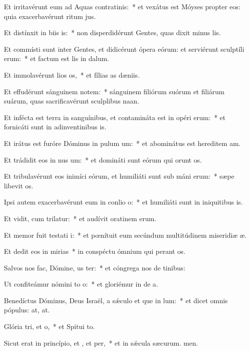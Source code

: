 \item Et irritavérunt eum ad Aquas contratinis:~* et vexátus est Móyses propter eos: quia exacerbavérunt ritum jus.
\item Et distínxit in biis is:~* non disperdidérunt Gentes, quas dixit minus lis.
\item Et commísti sunt inter Gentes, et didicérunt ópera eórum: et serviérunt sculptíli erum:~* et factum est lis in dalum.
\item Et immolavérunt lios os,~* et fílias as dæniis.
\item Et effudérunt sánguinem notem:~* sánguinem filiórum suórum et filiárum suárum, quas sacrificavérunt sculplibus naan.
\item Et infécta est terra in sanguínibus, et contamináta est in opéri erum:~* et fornicáti sunt in adinventinibus is.
\item Et irátus est furóre Dóminus in pulum um:~* et abominátus est hereditem am.
\item Et trádidit eos in nus um:~* et domináti sunt eórum qui orunt os.
\item Et tribulavérunt eos inimíci eórum, et humiliáti sunt sub máni erum:~* sæpe libevit os.
\item Ipsi autem exacerbavérunt eum in conlio o:~* et humiliáti sunt in iniquitibus is.
\item Et vidit, cum trilatur:~* et audívit oratinem erum.
\item Et memor fuit testati i:~* et pœnítuit eum secúndum multitúdinem miseridiæ æ.
\item Et dedit eos in mirias~* in conspéctu ómnium qui perant os.
\item Salvos nos fac, Dómine, us ter:~* et cóngrega nos de tinibus:
\item Ut confiteámur nómini to o:~* et gloriémur in de a.
\item Benedíctus Dóminus, Deus Israël, a sǽculo et que in lum:~* et dicet omnis pópulus: at, at.
\item Glória tri, et o,~* et Spitui to.
\item Sicut erat in princípio, et , et per,~* et in sǽcula sæcurum. men.
